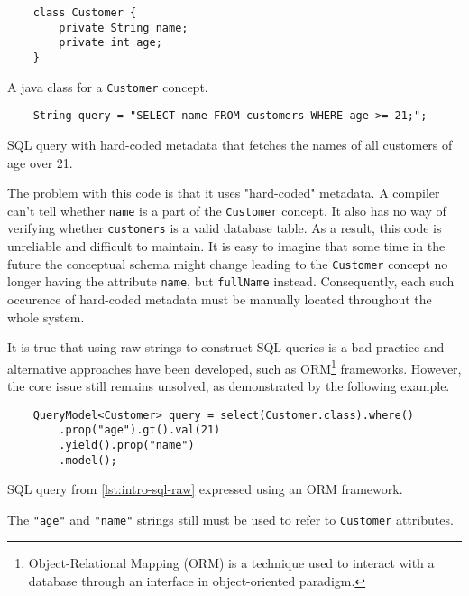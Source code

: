 \begin{listing}[H]
    \begin{verbatim}
    class Customer {
        private String name;
        private int age;
    }
    \end{verbatim}
    \caption{A java class for a \texttt{Customer} concept.}
    \label{lst:intro-customer}
\end{listing}


\begin{listing}[H]
    \begin{verbatim}
    String query = "SELECT name FROM customers WHERE age >= 21;";
    \end{verbatim}
    \caption{SQL query with hard-coded metadata that fetches the names of all customers of age over 21.}
    \label{lst:intro-sql-raw}
\end{listing}

The problem with this code is that it uses "hard-coded" metadata.
A compiler can't tell whether \texttt{name} is a part of the \texttt{Customer} concept.
It also has no way of verifying whether \texttt{customers} is a valid database table.
As a result, this code is unreliable and difficult to maintain.
It is easy to imagine that some time in the future the conceptual schema might change leading to the \texttt{Customer} concept no longer having the attribute \texttt{name}, but \texttt{fullName} instead.
Consequently, each such occurence of hard-coded metadata must be manually located throughout the whole system.

\n

It is true that using raw strings to construct SQL queries is a bad practice and alternative approaches have been developed, such as ORM\footnote{Object-Relational Mapping (ORM) is a technique used to interact with a database through an interface in object-oriented paradigm.} frameworks.
However, the core issue still remains unsolved, as demonstrated by the following example.

\begin{listing}[H]
    \begin{verbatim}
    QueryModel<Customer> query = select(Customer.class).where()
        .prop("age").gt().val(21)
        .yield().prop("name")
        .model();
    \end{verbatim}
    \caption{SQL query from \ref{lst:intro-sql-raw} expressed using an ORM framework.}
    \label{lst:intro-eql}
\end{listing}

The \texttt{"age"} and \texttt{"name"} strings still must be used to refer to \texttt{Customer} attributes.

